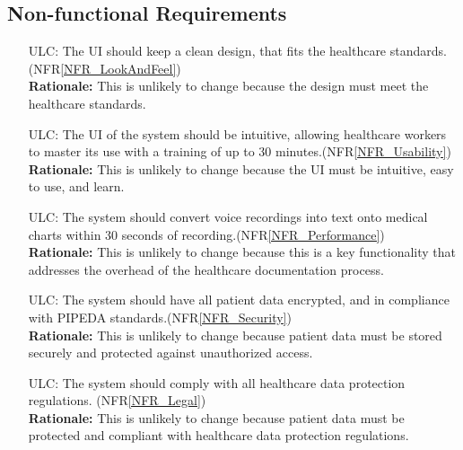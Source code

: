 \documentclass[12pt]{article}
\newcounter{lcnum} %
\newcounter{ulcnum} %
\begin{document}
\subsection{Non-functional Requirements}
\noindent \begin{itemize}
  \item[ULC\refstepcounter{ulcnum}\theulcnum\label{ULC_LookAndFeel}:] The UI should keep a clean design, that fits the healthcare standards.(NFR\ref{NFR_LookAndFeel})\\
  \textbf{Rationale:} This is unlikely to change because the design must meet the healthcare standards.

  \item[ULC\refstepcounter{ulcnum}\theulcnum\label{ULC_usability}:] The UI of the system should be intuitive, allowing healthcare workers to master its use with a training of up to 30 minutes.(NFR\ref{NFR_Usability})\\
  \textbf{Rationale:} This is unlikely to change because the UI must be intuitive, easy to use, and learn.

  \item[ULC\refstepcounter{ulcnum}\theulcnum\label{ULC_performance}:] The system should convert voice recordings into text onto medical charts within 30 seconds of recording.(NFR\ref{NFR_Performance})\\
  \textbf{Rationale:} This is unlikely to change because this is a key functionality that addresses the overhead of the healthcare documentation process.

  \item[ULC\refstepcounter{ulcnum}\theulcnum\label{ULC_security}:] The system should have all patient data encrypted, and in compliance with PIPEDA standards.(NFR\ref{NFR_Security})\\
  \textbf{Rationale:} This is unlikely to change because patient data must be stored securely and protected against unauthorized access.

  \item[ULC\refstepcounter{ulcnum}\theulcnum\label{ULC_legal}:] The system should comply with all healthcare data protection regulations. (NFR\ref{NFR_Legal})\\
  \textbf{Rationale:} This is unlikely to change because patient data must be protected and compliant with healthcare data protection regulations.
\end{itemize}
\end{document}
